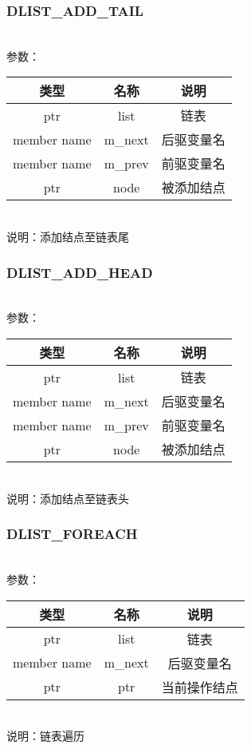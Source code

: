 \subsubsection{DLIST\_ADD\_TAIL}
\\
参数：\\
\begin{tabular}{|c|c|c|}
    \hline
    类型 & 名称 & 说明\\\hline
    ptr & list & 链表\\\hline
    member name & m\_next & 后驱变量名\\\hline
    member name & m\_prev & 前驱变量名\\\hline
    ptr & node & 被添加结点\\\hline
\end{tabular}\\
说明：添加结点至链表尾

\subsubsection{DLIST\_ADD\_HEAD}
\\
参数：\\
\begin{tabular}{|c|c|c|}
    \hline
    类型 & 名称 & 说明\\\hline
    ptr & list & 链表\\\hline
    member name & m\_next & 后驱变量名\\\hline
    member name & m\_prev & 前驱变量名\\\hline
    ptr & node & 被添加结点\\\hline
\end{tabular}\\
说明：添加结点至链表头

\subsubsection{DLIST\_FOREACH}
\\
参数：\\
\begin{tabular}{|c|c|c|}
    \hline
    类型 & 名称 & 说明\\\hline
    ptr & list & 链表\\\hline
    member name & m\_next & 后驱变量名\\\hline
    ptr & ptr & 当前操作结点\\\hline
\end{tabular}\\
说明：链表遍历

